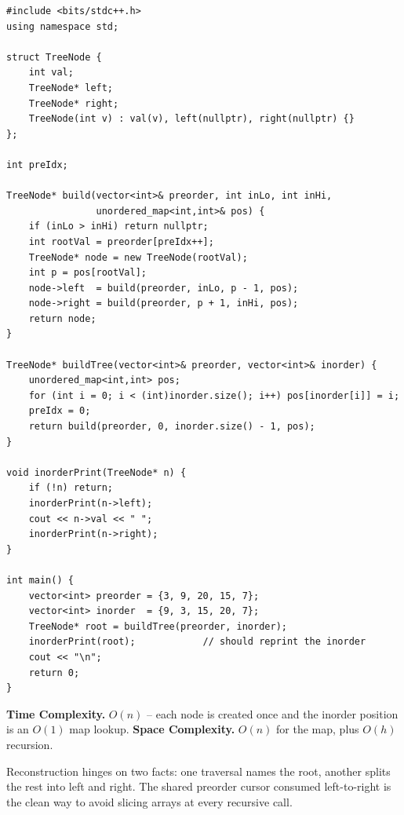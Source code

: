 \begin{lstlisting}
#include <bits/stdc++.h>
using namespace std;

struct TreeNode {
    int val;
    TreeNode* left;
    TreeNode* right;
    TreeNode(int v) : val(v), left(nullptr), right(nullptr) {}
};

int preIdx;

TreeNode* build(vector<int>& preorder, int inLo, int inHi,
                unordered_map<int,int>& pos) {
    if (inLo > inHi) return nullptr;
    int rootVal = preorder[preIdx++];
    TreeNode* node = new TreeNode(rootVal);
    int p = pos[rootVal];
    node->left  = build(preorder, inLo, p - 1, pos);
    node->right = build(preorder, p + 1, inHi, pos);
    return node;
}

TreeNode* buildTree(vector<int>& preorder, vector<int>& inorder) {
    unordered_map<int,int> pos;
    for (int i = 0; i < (int)inorder.size(); i++) pos[inorder[i]] = i;
    preIdx = 0;
    return build(preorder, 0, inorder.size() - 1, pos);
}

void inorderPrint(TreeNode* n) {
    if (!n) return;
    inorderPrint(n->left);
    cout << n->val << " ";
    inorderPrint(n->right);
}

int main() {
    vector<int> preorder = {3, 9, 20, 15, 7};
    vector<int> inorder  = {9, 3, 15, 20, 7};
    TreeNode* root = buildTree(preorder, inorder);
    inorderPrint(root);            // should reprint the inorder
    cout << "\n";
    return 0;
}
\end{lstlisting}

\begin{complexitybox}
\textbf{Time Complexity.} $O(n)$ -- each node is created once and the
inorder position is an $O(1)$ map lookup. \textbf{Space Complexity.}
$O(n)$ for the map, plus $O(h)$ recursion.
\end{complexitybox}

\begin{takeawaybox}
Reconstruction hinges on two facts: one traversal names the root, another
splits the rest into left and right. The shared preorder cursor consumed
left-to-right is the clean way to avoid slicing arrays at every recursive
call.
\end{takeawaybox}
